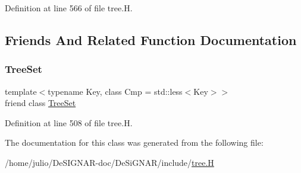 Definition at line 566 of file tree.\+H.



\subsection{Friends And Related Function Documentation}
\mbox{\label{class_designar_1_1_tree_set_1_1_preorder_iterator_a7caa42294700d2a60905ec3458a7cd8a}} 
\subsubsection{\texorpdfstring{Tree\+Set}{TreeSet}}
{\footnotesize\ttfamily template$<$typename Key, class Cmp = std\+::less$<$\+Key$>$$>$ \\
friend class \hyperlink{class_designar_1_1_tree_set}{Tree\+Set}\hspace{0.3cm}{\ttfamily [friend]}}



Definition at line 508 of file tree.\+H.



The documentation for this class was generated from the following file\+:\begin{DoxyCompactItemize}
\item 
/home/julio/\+De\+S\+I\+G\+N\+A\+R-\/doc/\+De\+Si\+G\+N\+A\+R/include/\hyperlink{tree_8_h}{tree.\+H}\end{DoxyCompactItemize}

